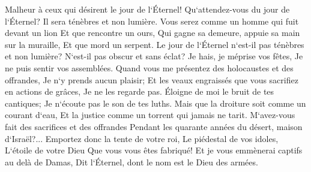 \verse Malheur à ceux qui désirent le jour de l`Éternel! Qu`attendez-vous du jour de l`Éternel? Il sera ténèbres et non lumière. 
\verse Vous serez comme un homme qui fuit devant un lion Et que rencontre un ours, Qui gagne sa demeure, appuie sa main sur la muraille, Et que mord un serpent. 
\verse Le jour de l`Éternel n`est-il pas ténèbres et non lumière? N`est-il pas obscur et sans éclat? 
\verse Je hais, je méprise vos fêtes, Je ne puis sentir vos assemblées. 
\verse Quand vous me présentez des holocaustes et des offrandes, Je n`y prends aucun plaisir; Et les veaux engraissés que vous sacrifiez en actions de grâces, Je ne les regarde pas. 
\verse Éloigne de moi le bruit de tes cantiques; Je n`écoute pas le son de tes luths. 
\verse Mais que la droiture soit comme un courant d`eau, Et la justice comme un torrent qui jamais ne tarit. 
\verse M`avez-vous fait des sacrifices et des offrandes Pendant les quarante années du désert, maison d`Israël?... 
\verse Emportez donc la tente de votre roi, Le piédestal de vos idoles, L`étoile de votre Dieu Que vous vous êtes fabriqué! 
\verse Et je vous emmènerai captifs au delà de Damas, Dit l`Éternel, dont le nom est le Dieu des armées. 

